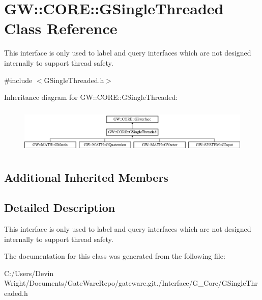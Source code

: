 \hypertarget{class_g_w_1_1_c_o_r_e_1_1_g_single_threaded}{}\section{GW\+:\+:C\+O\+RE\+:\+:G\+Single\+Threaded Class Reference}
\label{class_g_w_1_1_c_o_r_e_1_1_g_single_threaded}


This interface is only used to label and query interfaces which are not designed internally to support thread safety.  




{\ttfamily \#include $<$G\+Single\+Threaded.\+h$>$}

Inheritance diagram for GW\+:\+:C\+O\+RE\+:\+:G\+Single\+Threaded\+:\begin{figure}[H]
\begin{center}
\leavevmode
\includegraphics[height=2.270270cm]{class_g_w_1_1_c_o_r_e_1_1_g_single_threaded}
\end{center}
\end{figure}
\subsection*{Additional Inherited Members}


\subsection{Detailed Description}
This interface is only used to label and query interfaces which are not designed internally to support thread safety. 

The documentation for this class was generated from the following file\+:\begin{DoxyCompactItemize}
\item 
C\+:/\+Users/\+Devin Wright/\+Documents/\+Gate\+Ware\+Repo/gateware.\+git./\+Interface/\+G\+\_\+\+Core/G\+Single\+Threaded.\+h\end{DoxyCompactItemize}
